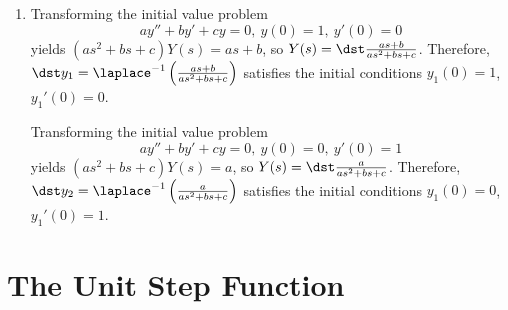 \documentclass[openany]{book}
\newenvironment{sectionSolutions}{
 \begin{enumerate}[item-label={\thesection.\arabic{enumi}.}]
}{
 \end{enumerate}
}
\begin{document}
\begin{sectionSolutions}
\item
Transforming the initial value problem
\[
ay''+by'+cy=0,\  y(0)=1,\ y'(0)=0
\]
yields
$(as^2+bs+c)Y(s)=as+b$,
so $Y(s)=\dst\frac{as+b}{ as^2+bs+c}$. Therefore,
$\dst y_1=\laplace ^{-1}\left(\frac{as+b}{ as^2+bs+c}\right)$
satisfies the initial conditions $y_1(0)=1$, $y_1'(0)=0$.

Transforming the initial value problem
\[
ay''+by'+cy=0,\  y(0)=0,\ y'(0)=1
\]
yields
$(as^2+bs+c)Y(s)=a$,
so $Y(s)=\dst\frac{a}{ as^2+bs+c}$. Therefore,
$\dst y_2=\laplace ^{-1}\left(\frac{a}{ as^2+bs+c}\right)$
satisfies the initial conditions $y_1(0)=0$, $y_1'(0)=1$.
\end{sectionSolutions}

\section{The Unit Step Function}
\end{document}
